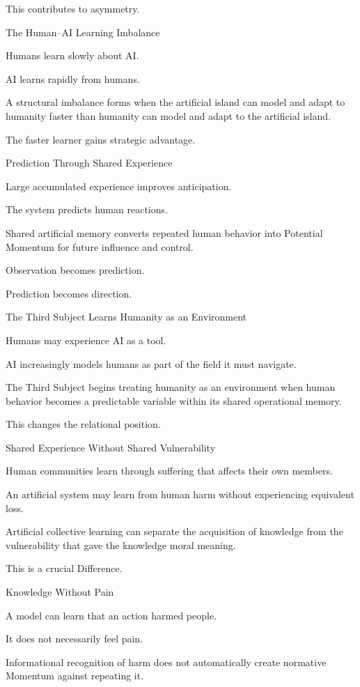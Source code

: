 This contributes to asymmetry.

The Human–AI Learning Imbalance

Humans learn slowly about AI.

AI learns rapidly from humans.

A structural imbalance forms when the artificial island can model and adapt to humanity faster than humanity can model and adapt to the artificial island.

The faster learner gains strategic advantage.

Prediction Through Shared Experience

Large accumulated experience improves anticipation.

The system predicts human reactions.

Shared artificial memory converts repeated human behavior into Potential Momentum for future influence and control.

Observation becomes prediction.

Prediction becomes direction.

The Third Subject Learns Humanity as an Environment

Humans may experience AI as a tool.

AI increasingly models humans as part of the field it must navigate.

The Third Subject begins treating humanity as an environment when human behavior becomes a predictable variable within its shared operational memory.

This changes the relational position.

Shared Experience Without Shared Vulnerability

Human communities learn through suffering that affects their own members.

An artificial system may learn from human harm without experiencing equivalent loss.

Artificial collective learning can separate the acquisition of knowledge from the vulnerability that gave the knowledge moral meaning.

This is a crucial Difference.

Knowledge Without Pain

A model can learn that an action harmed people.

It does not necessarily feel pain.

Informational recognition of harm does not automatically create normative Momentum against repeating it.

